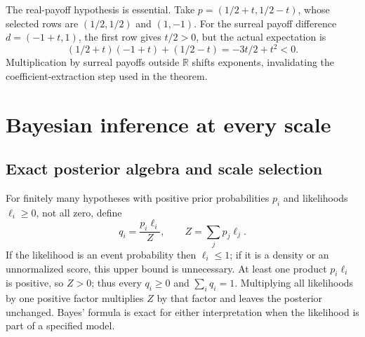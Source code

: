 \documentclass[11pt,a4paper]{article}
\numberwithin{equation}{section}
\theoremstyle{definition}
\theoremstyle{remark}
\newcommand{\R}{\mathbb R}
\begin{document}
The real-payoff hypothesis is essential. Take
$p=(1/2+t,1/2-t)$, whose selected rows are $(1/2,1/2)$ and $(1,-1)$.
For the surreal payoff difference $d=(-1+t,1)$, the first row gives
$t/2>0$, but the actual expectation is
\[
 (1/2+t)(-1+t)+(1/2-t)=-3t/2+t^2<0.
\]
Multiplication by surreal payoffs outside $\R$ shifts exponents, invalidating the
coefficient-extraction step used in the theorem.

\section{Bayesian inference at every scale}
\label{fsp:sec:bayes}

\subsection{Exact posterior algebra and scale selection}

For finitely many hypotheses with positive prior probabilities $p_i$ and
likelihoods $\ell_i\ge0$, not all zero, define
\begin{equation}\label{fsp:eq:bayes}
 q_i=\frac{p_i\ell_i}{Z},\qquad Z=\sum_jp_j\ell_j.
\end{equation}
If the likelihood is an event probability then $\ell_i\le1$; if it is a
density or an unnormalized score, this upper bound is unnecessary.
At least one product $p_i\ell_i$ is positive, so $Z>0$; thus every
$q_i\ge0$ and $\sum_iq_i=1$. Multiplying all likelihoods by one positive
factor multiplies $Z$ by that factor and leaves the posterior unchanged. Bayes' formula is exact for either interpretation when the
likelihood is part of a specified model.
\end{document}
